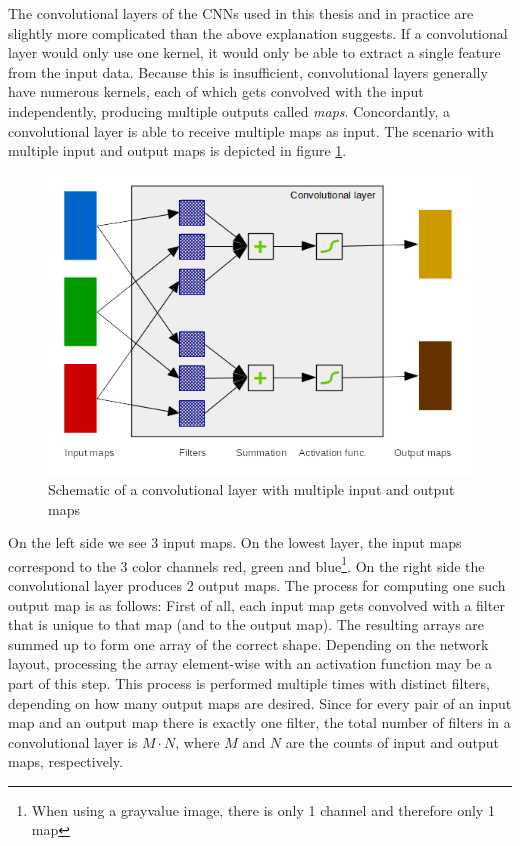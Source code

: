 \documentclass[11pt, a4paper]{article}
\begin{document}
The convolutional layers of the CNNs used in this thesis and in practice are slightly more complicated than the above explanation suggests. If a convolutional layer would only use one kernel, it would only be able to extract a single feature from the input data. Because this is insufficient, convolutional layers generally have numerous kernels, each of which gets convolved with the input independently, producing multiple outputs called \emph{maps}. Concordantly, a convolutional layer is able to receive multiple maps as input. The scenario with multiple input and output maps is depicted in figure \ref{fig:convolutional-layer-maps}.

\begin{figure}[h!tb]
	\centering
	\includegraphics[scale=1.00]{images/convolution_layer_maps.png}
	\caption[Input and output maps in convolutional layers]{Schematic of a convolutional layer with multiple input and output maps}
	\label{fig:convolutional-layer-maps}
\end{figure}

On the left side we see 3 input maps. On the lowest layer, the input maps correspond to the 3 color channels red, green and blue\footnote{When using a grayvalue image, there is only 1 channel and therefore only 1 map}. On the right side the convolutional layer produces 2 output maps. The process for computing one such output map is as follows: First of all, each input map gets convolved with a filter that is unique to that map (and to the output map). The resulting arrays are summed up to form one array of the correct shape. Depending on the network layout, processing the array element-wise with an activation function may be a part of this step. This process is performed multiple times with distinct filters, depending on how many output maps are desired. Since for every pair of an input map and an output map there is exactly one filter, the total number of filters in a convolutional layer is $M \cdot N$, where $M$ and $N$ are the counts of input and output maps, respectively.
\end{document}

